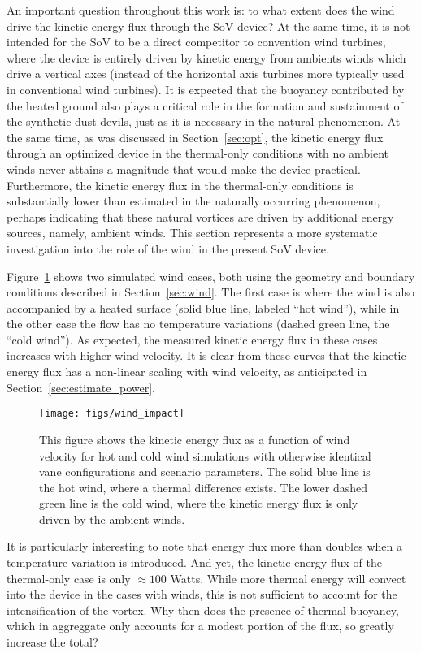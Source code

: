An important question throughout this work is: to what extent does the wind
drive the kinetic energy flux through the SoV device? At the same time, 
it is not intended for the SoV to be a direct competitor to convention wind turbines,
where the device is entirely driven by kinetic energy from ambients winds which drive 
a vertical axes (instead of the horizontal axis turbines more typically 
used in conventional wind turbines). It is expected that the buoyancy contributed
by the heated ground also plays a critical role in the formation and sustainment of 
the synthetic dust devils, just as it is necessary in the natural phenomenon. 
At the same time, as was discussed in Section~\ref{sec:opt}, 
the kinetic energy flux through an optimized device in the thermal-only conditions 
with no ambient winds
never attains a magnitude that would make the device practical. 
Furthermore, the kinetic energy flux in the thermal-only conditions 
is substantially lower than estimated in the naturally occurring phenomenon, 
perhaps indicating that these natural vortices are driven by additional energy 
sources, namely, ambient winds.
This section represents a more systematic investigation into the role of the wind 
in the present SoV device. 

Figure~\ref{fig:wind_impact} shows two simulated wind cases, both using
the geometry and boundary conditions described in
Section~\ref{sec:wind}. The first case is where the wind is also
accompanied by a heated surface (solid blue line, labeled ``hot wind''),
while in the other case the flow has no temperature variations (dashed
green line, the ``cold wind''). As expected, the measured kinetic energy
flux in these cases increases with higher wind velocity. It is clear
from these curves that the kinetic energy flux has a non-linear scaling
with wind velocity, as anticipated in Section~\ref{sec:estimate_power}. 

\begin{figure}[htb!]
\centering
 \texttt{[image: figs/wind\_impact]}
 \caption{This figure shows the kinetic energy flux as a function of
 wind velocity for hot and cold wind simulations with otherwise
 identical vane configurations and scenario parameters. The solid blue
 line is the hot wind, where a thermal difference exists. The lower
 dashed green line is the cold wind, where the kinetic energy flux is
 only driven by the ambient winds. }  
 \label{fig:wind_impact}  
\end{figure}

It is particularly interesting to note that energy flux more than
doubles when a temperature variation is introduced. And yet, the kinetic
energy flux of the thermal-only case is  only $\approx 100$ Watts.  
While more thermal energy will convect into the device in the cases with
winds, this is not sufficient to account for the intensification of the
vortex. Why then does the presence of thermal buoyancy, which in
aggreggate only accounts for a modest portion of the flux, so greatly
increase the total? 

